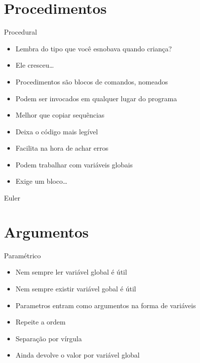 \documentclass[14pt]{beamer}
\begin{document}
	\section{Procedimentos}
		\begin{frame}{Procedural}
			\begin{itemize}
				\presentationPause\item Lembra do tipo  que você esnobava quando criança?
				\presentationPause\item Ele cresceu\dots
				\presentationPause\item Procedimentos são blocos de comandos, nomeados
				\presentationPause\item Podem ser invocados em qualquer lugar do programa
				\presentationPause\item Melhor que copiar sequências
				\presentationPause\item Deixa o código mais legível
				\presentationPause\item Facilita na hora de achar erros
				\presentationPause\item Podem trabalhar com variáveis globais
				\presentationPause\item Exige um bloco\dots
			\end{itemize}
			\presentationPause
		\end{frame}

		\begin{frame}{Euler}
			\presentationPause
		\end{frame}

	\section{Argumentos}
		\begin{frame}{Paramétrico}
			\begin{itemize}
				\presentationPause\item Nem sempre ler variável global é útil
				\presentationPause\item Nem sempre existir variável gobal é útil
				\presentationPause\item Parametros entram como argumentos na forma de variáveis
				\presentationPause\item Repeite a ordem
				\presentationPause\item Separação por vírgula
				\presentationPause\item Ainda devolve o valor por variável global
			\end{itemize}
			\presentationPause
		\end{frame}
\end{document}
